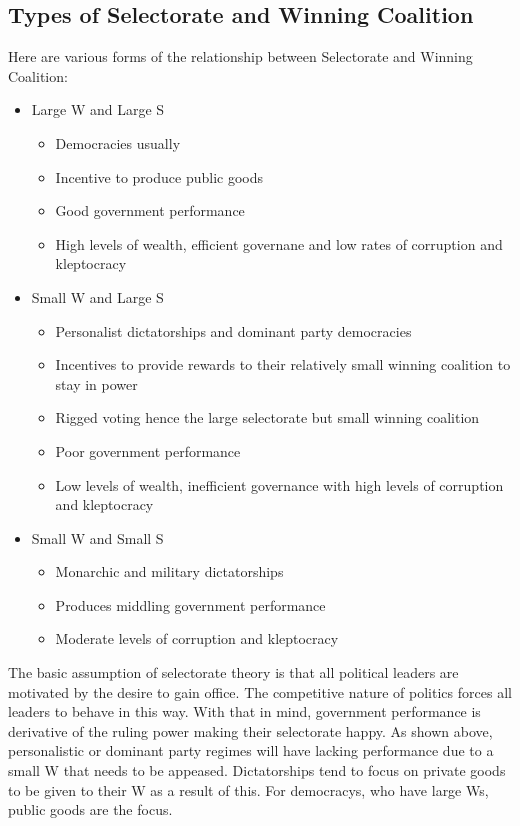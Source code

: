 \documentclass[12pt, letterpaper]{article}
\begin{document}
\subsection{Types of Selectorate and Winning Coalition}
Here are various forms of the relationship between Selectorate and Winning Coalition:
\begin{itemize}
	\item Large W and Large S
		\begin{itemize}
			\item Democracies usually
			\item Incentive to produce public goods
			\item Good government performance
			\item High levels of wealth, efficient governane and low rates of corruption and kleptocracy
		\end{itemize}
	\item Small W and Large S
		\begin{itemize}
			\item Personalist dictatorships and dominant party democracies
			\item Incentives to provide rewards to their relatively small winning coalition to stay in power
			\item Rigged voting hence the large selectorate but small winning coalition
			\item Poor government performance
			\item Low levels of wealth, inefficient governance with high levels of corruption and kleptocracy
		\end{itemize}
	\item Small W and Small S
		\begin{itemize}
			\item Monarchic and military dictatorships
			\item Produces middling government performance
			\item Moderate levels of corruption and kleptocracy
		\end{itemize}
\end{itemize}

The basic assumption of selectorate theory is that all political leaders are motivated by the desire to gain office. The competitive nature of politics forces all leaders to behave in this way. With that in mind, government performance is derivative of the ruling power making their selectorate happy. As shown above, personalistic or dominant party regimes will have lacking performance due to a small W that needs to be appeased. Dictatorships tend to focus on private goods to be given to their W as a result of this. For democracys, who have large Ws, public goods are the focus.
\end{document}
